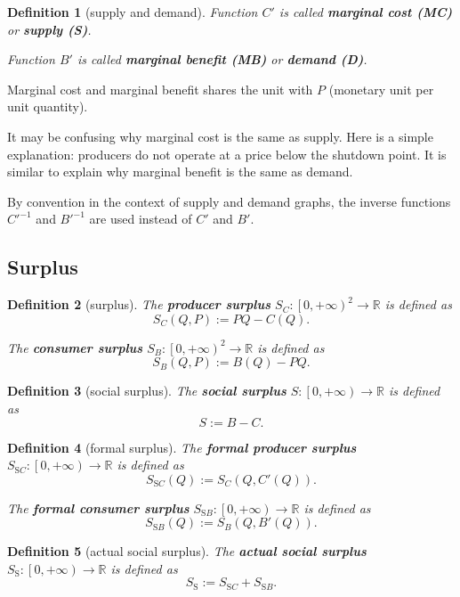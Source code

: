 \documentclass{article}
\newtheorem{definition}{Definition}[subsection]
\begin{document}
\begin{definition}[supply and demand]
Function $C'$ is called \textbf{marginal cost (MC)} or \textbf{supply (S)}.

Function $B'$ is called \textbf{marginal benefit (MB)} or \textbf{demand (D)}.
\end{definition}

Marginal cost and marginal benefit shares the unit with $P$
(monetary unit per unit quantity).

It may be confusing why marginal cost is the same as supply.
Here is a simple explanation: producers do not operate at a price below the shutdown point.
It is similar to explain why marginal benefit is the same as demand.

By convention in the context of supply and demand graphs, the inverse functions $C'^{-1}$ and $B'^{-1}$ are used instead of $C'$ and $B'$.

\subsection{Surplus}

\begin{definition}[surplus]
\label{surplus}
The \textbf{producer surplus} $S_C:\left[0,+\infty\right)^2\to\mathbb R$ is defined as
$$S_C\left(Q,P\right):=PQ-C\left(Q\right).$$

The \textbf{consumer surplus} $S_B:\left[0,+\infty\right)^2\to\mathbb R$ is defined as
$$S_B\left(Q,P\right):=B\left(Q\right)-PQ.$$
\end{definition}

\begin{definition}[social surplus]
\label{social surplus}
The \textbf{social surplus} $S:\left[0,+\infty\right)\to\mathbb R$ is defined as
$$S:=B-C.$$
\end{definition}

\begin{definition}[formal surplus]
\label{formal surplus}
The \textbf{formal producer surplus} $S_{\mathrm SC}:\left[0,+\infty\right)\to\mathbb R$ is defined as
$$S_{\mathrm SC}\left(Q\right):=S_C\left(Q,C'\left(Q\right)\right).$$

The \textbf{formal consumer surplus} $S_{\mathrm SB}:\left[0,+\infty\right)\to\mathbb R$ is defined as
$$S_{\mathrm SB}\left(Q\right):=S_B\left(Q,B'\left(Q\right)\right).$$
\end{definition}

\begin{definition}[actual social surplus]
\label{actual social surplus}
The \textbf{actual social surplus} $S_\mathrm S:\left[0,+\infty\right)\to\mathbb R$ is defined as
$$S_\mathrm S:=S_{\mathrm SC}+S_{\mathrm SB}.$$
\end{definition}
\end{document}
